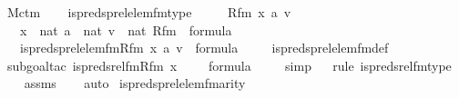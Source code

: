 \begin{isabellebody}
\isanewline
{}\isamarkupfalse%
\ M{\isacharunderscore}{\kern0pt}ctm\ \isanewline
{}\ \isanewline
\isanewline
{}\isamarkupfalse%
\ is{\isacharunderscore}{\kern0pt}preds{\isacharunderscore}{\kern0pt}prel{\isacharunderscore}{\kern0pt}elem{\isacharunderscore}{\kern0pt}fm{\isacharunderscore}{\kern0pt}type\ {\isacharcolon}{\kern0pt}\ \isanewline
\ \ \ Rfm\ x\ a\ v\ \isanewline
\ \ \ {\isachardoublequoteopen}x\ {\isasymin}\ nat{\isachardoublequoteclose}\ {\isachardoublequoteopen}a\ {\isasymin}\ nat{\isachardoublequoteclose}\ {\isachardoublequoteopen}v\ {\isasymin}\ nat{\isachardoublequoteclose}\ {\isachardoublequoteopen}Rfm\ {\isasymin}\ formula{\isachardoublequoteclose}\isanewline
\ \ \ {\isachardoublequoteopen}is{\isacharunderscore}{\kern0pt}preds{\isacharunderscore}{\kern0pt}prel{\isacharunderscore}{\kern0pt}elem{\isacharunderscore}{\kern0pt}fm{\isacharparenleft}{\kern0pt}Rfm{\isacharcomma}{\kern0pt}\ x{\isacharcomma}{\kern0pt}\ a{\isacharcomma}{\kern0pt}\ v{\isacharparenright}{\kern0pt}\ {\isasymin}\ formula{\isachardoublequoteclose}\ \isanewline
%
\isadelimproof
\isanewline
\ \ %
\endisadelimproof
%
\isatagproof
{}\isamarkupfalse%
\ is{\isacharunderscore}{\kern0pt}preds{\isacharunderscore}{\kern0pt}prel{\isacharunderscore}{\kern0pt}elem{\isacharunderscore}{\kern0pt}fm{\isacharunderscore}{\kern0pt}def\isanewline
\ \ \isamarkupfalse%
\ {\isacharparenleft}{\kern0pt}subgoal{\isacharunderscore}{\kern0pt}tac\ {\isachardoublequoteopen}is{\isacharunderscore}{\kern0pt}preds{\isacharunderscore}{\kern0pt}rel{\isacharunderscore}{\kern0pt}fm{\isacharparenleft}{\kern0pt}Rfm{\isacharcomma}{\kern0pt}\ x\ {\isacharhash}{\kern0pt}{\isacharplus}{\kern0pt}\ {}{\isacharcomma}{\kern0pt}\ {}{\isacharparenright}{\kern0pt}\ {\isasymin}\ formula{\isachardoublequoteclose}{\isacharparenright}{\kern0pt}\isanewline
\ \ \ \isamarkupfalse%
\ simp\isanewline
\ \ \isamarkupfalse%
{\isacharparenleft}{\kern0pt}rule\ is{\isacharunderscore}{\kern0pt}preds{\isacharunderscore}{\kern0pt}rel{\isacharunderscore}{\kern0pt}fm{\isacharunderscore}{\kern0pt}type{\isacharparenright}{\kern0pt}\isanewline
\ \ \isamarkupfalse%
\ assms\isanewline
\ \ \isamarkupfalse%
\ auto%
\endisatagproof
{\isafoldproof}%
%
\isadelimproof
\isanewline
%
\endisadelimproof
\isanewline
{}\isamarkupfalse%
\ is{\isacharunderscore}{\kern0pt}preds{\isacharunderscore}{\kern0pt}prel{\isacharunderscore}{\kern0pt}elem{\isacharunderscore}{\kern0pt}fm{\isacharunderscore}{\kern0pt}arity\ {\isacharcolon}{\kern0pt}\ \isanewline

\end{isabellebody}
